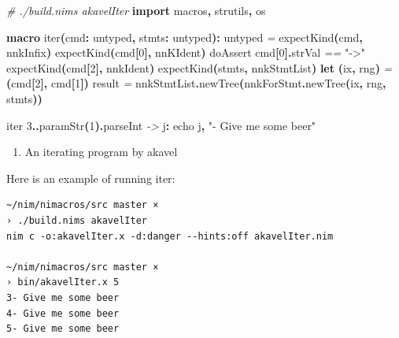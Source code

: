 \documentclass[
  12pt,
]{book}
\newenvironment{Shaded}{}{}
\newcommand{\CommentTok}[1]{\textcolor[rgb]{0.38,0.63,0.69}{\textit{#1}}}
\newcommand{\DataTypeTok}[1]{\textcolor[rgb]{0.56,0.13,0.00}{#1}}
\newcommand{\DecValTok}[1]{\textcolor[rgb]{0.25,0.63,0.44}{#1}}
\newcommand{\KeywordTok}[1]{\textcolor[rgb]{0.00,0.44,0.13}{\textbf{#1}}}
\newcommand{\NormalTok}[1]{#1}
\newcommand{\OtherTok}[1]{\textcolor[rgb]{0.00,0.44,0.13}{#1}}
\newcommand{\StringTok}[1]{\textcolor[rgb]{0.25,0.44,0.63}{#1}}
\providecommand{\tightlist}{%
  \setlength{\itemsep}{0pt}\setlength{\parskip}{0pt}}
\begin{document}
\begin{Shaded}
\begin{Highlighting}[]
\CommentTok{\# ./build.nims akavelIter}
\KeywordTok{import}\NormalTok{ macros}\KeywordTok{,}\NormalTok{ strutils}\KeywordTok{,}\NormalTok{ os}

\KeywordTok{macro }\StringTok{iter}\KeywordTok{(}\NormalTok{cmd}\KeywordTok{:} \DataTypeTok{untyped}\KeywordTok{,}\NormalTok{ stmts}\KeywordTok{:} \DataTypeTok{untyped}\KeywordTok{):} \DataTypeTok{untyped} \CommentTok{=}
  \DataTypeTok{expectKind}\KeywordTok{(}\NormalTok{cmd}\KeywordTok{,}\NormalTok{ nnkInfix}\KeywordTok{)}
  \DataTypeTok{expectKind}\KeywordTok{(}\NormalTok{cmd}\KeywordTok{[}\DecValTok{0}\KeywordTok{],}\NormalTok{ nnKIdent}\KeywordTok{)}
  \DataTypeTok{doAssert}\NormalTok{ cmd}\KeywordTok{[}\DecValTok{0}\KeywordTok{].}\DataTypeTok{strVal} \CommentTok{==} \StringTok{"{-}\textgreater{}"}
  \DataTypeTok{expectKind}\KeywordTok{(}\NormalTok{cmd}\KeywordTok{[}\DecValTok{2}\KeywordTok{],}\NormalTok{ nnkIdent}\KeywordTok{)}
  \DataTypeTok{expectKind}\KeywordTok{(}\NormalTok{stmts}\KeywordTok{,}\NormalTok{ nnkStmtList}\KeywordTok{)}
  \KeywordTok{let} \KeywordTok{(}\NormalTok{ix}\KeywordTok{,}\NormalTok{ rng}\KeywordTok{)} \CommentTok{=} \KeywordTok{(}\NormalTok{cmd}\KeywordTok{[}\DecValTok{2}\KeywordTok{],}\NormalTok{ cmd}\KeywordTok{[}\DecValTok{1}\KeywordTok{])}
  \OtherTok{result} \CommentTok{=}\NormalTok{ nnkStmtList}\KeywordTok{.}\DataTypeTok{newTree}\KeywordTok{(}\NormalTok{nnkForStmt}\KeywordTok{.}\DataTypeTok{newTree}\KeywordTok{(}\NormalTok{ix}\KeywordTok{,}\NormalTok{ rng}\KeywordTok{,}\NormalTok{ stmts}\KeywordTok{))}

\DataTypeTok{iter} \DecValTok{3}\KeywordTok{..}\DataTypeTok{paramStr}\KeywordTok{(}\DecValTok{1}\KeywordTok{).}\DataTypeTok{parseInt} \CommentTok{{-}\textgreater{}}\NormalTok{ j}\KeywordTok{:}
    \DataTypeTok{echo}\NormalTok{ j}\KeywordTok{,} \StringTok{"{-} Give me some beer"}
\end{Highlighting}
\end{Shaded}

\begin{enumerate}
\def\labelenumi{(\arabic{enumi})}
\setcounter{enumi}{18}
\tightlist
\item
  An iterating program by akavel
\end{enumerate}

Here is an example of running iter:

\begin{verbatim}
~/nim/nimacros/src master ×
› ./build.nims akavelIter
nim c -o:akavelIter.x -d:danger --hints:off akavelIter.nim

~/nim/nimacros/src master ×
› bin/akavelIter.x 5
3- Give me some beer
4- Give me some beer
5- Give me some beer
\end{verbatim}
\end{document}
